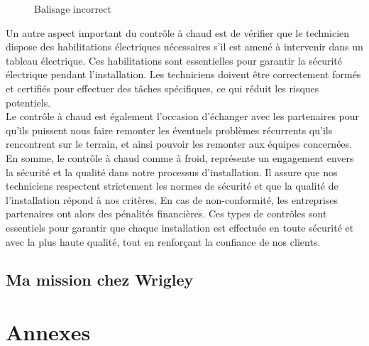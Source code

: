 \documentclass[12pt, a4paper]{article}
\begin{document}
\begin{figure}[htbp]
\begin{minipage}[b]{0.4\textwidth}
      \caption{Balisage incorrect}
    \end{minipage}
\end{figure}

Un autre aspect important du contrôle à chaud est
de vérifier que le technicien dispose des
habilitations électriques nécessaires s'il
est amené à intervenir dans un tableau
électrique. Ces habilitations sont essentielles
pour garantir la sécurité électrique pendant
l'installation. Les techniciens doivent être
correctement formés et certifiés pour effectuer
des tâches spécifiques, ce qui réduit les
risques potentiels.\\

Le contrôle à chaud est également l'occasion
d'échanger avec les partenaires pour qu'ils 
puissent nous faire remonter les éventuels
problèmes récurrents qu'ils rencontrent sur le terrain, 
et ainsi pouvoir les remonter aux équipes concernées.\\

En somme, le contrôle à chaud comme à froid,
représente un engagement envers la sécurité et la qualité
dans notre processus d'installation. Il assure
que nos techniciens respectent strictement
les normes de sécurité et que la qualité de
l'installation répond à nos critères.
En cas de non-conformité, les entreprises 
partenaires ont alors des pénalités financières.
Ces types de contrôles sont essentiels pour garantir
que chaque installation est
effectuée en toute sécurité et avec la plus
haute qualité, tout en renforçant la confiance
de nos clients.


\newpage
\subsection{Ma mission chez Wrigley}
\section{Annexes}
\end{document}
